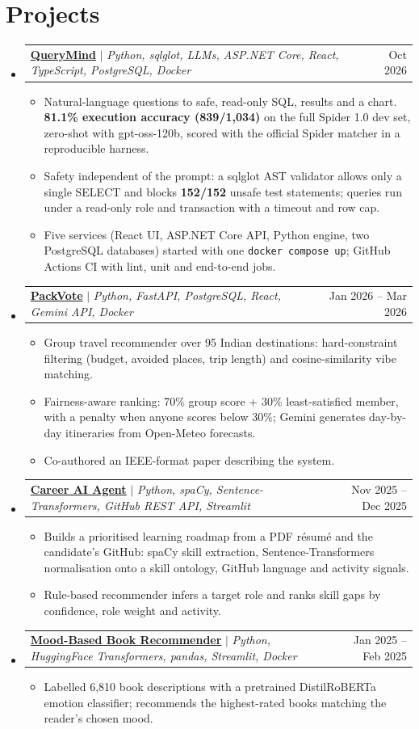 \documentclass[letterpaper,10.5pt]{article}
\makeatletter
\newcommand{\resumeItem}[1]{\item\small{#1 \vspace{-2pt}}}
\newcommand{\resumeProjectHeading}[2]{
    \item
    \begin{tabular*}{0.98\textwidth}{l@{\extracolsep{\fill}}r}
      \small#1 & \small #2 \\
    \end{tabular*}\vspace{-7pt}
}
\newcommand{\resumeSubHeadingListStart}{\begin{itemize}[leftmargin=0.15in, label={}]}
\newcommand{\resumeSubHeadingListEnd}{\end{itemize}}
\newcommand{\resumeItemListStart}{\begin{itemize}[leftmargin=0.18in]}
\newcommand{\resumeItemListEnd}{\end{itemize}\vspace{-5pt}}
\makeatother
\begin{document}
\section{Projects}
    \resumeSubHeadingListStart
      \resumeProjectHeading
          {\textbf{\href{https://github.com/sha728/querymind}{QueryMind}} $|$ \emph{Python, sqlglot, LLMs, ASP.NET Core, React, TypeScript, PostgreSQL, Docker}}{Oct 2026}
          \resumeItemListStart
            \resumeItem{Natural-language questions to safe, read-only SQL, results and a chart. \textbf{81.1\% execution accuracy (839/1,034)} on the full Spider 1.0 dev set, zero-shot with gpt-oss-120b, scored with the official Spider matcher in a reproducible harness.}
            \resumeItem{Safety independent of the prompt: a sqlglot AST validator allows only a single SELECT and blocks \textbf{152/152} unsafe test statements; queries run under a read-only role and transaction with a timeout and row cap.}
            \resumeItem{Five services (React UI, ASP.NET Core API, Python engine, two PostgreSQL databases) started with one \texttt{docker compose up}; GitHub Actions CI with lint, unit and end-to-end jobs.}
          \resumeItemListEnd
      \resumeProjectHeading
          {\textbf{\href{https://github.com/sha728/PackVoted}{PackVote}} $|$ \emph{Python, FastAPI, PostgreSQL, React, Gemini API, Docker}}{Jan 2026 -- Mar 2026}
          \resumeItemListStart
            \resumeItem{Group travel recommender over 95 Indian destinations: hard-constraint filtering (budget, avoided places, trip length) and cosine-similarity vibe matching.}
            \resumeItem{Fairness-aware ranking: 70\% group score + 30\% least-satisfied member, with a penalty when anyone scores below 30\%; Gemini generates day-by-day itineraries from Open-Meteo forecasts.}
            \resumeItem{Co-authored an IEEE-format paper describing the system.}
          \resumeItemListEnd
      \resumeProjectHeading
          {\textbf{\href{https://github.com/sha728/Career-Ai-Agent}{Career AI Agent}} $|$ \emph{Python, spaCy, Sentence-Transformers, GitHub REST API, Streamlit}}{Nov 2025 -- Dec 2025}
          \resumeItemListStart
            \resumeItem{Builds a prioritised learning roadmap from a PDF r\'esum\'e and the candidate's GitHub: spaCy skill extraction, Sentence-Transformers normalisation onto a skill ontology, GitHub language and activity signals.}
            \resumeItem{Rule-based recommender infers a target role and ranks skill gaps by confidence, role weight and activity.}
          \resumeItemListEnd
      \resumeProjectHeading
          {\textbf{\href{https://github.com/sha728/Book-Recommendation-System}{Mood-Based Book Recommender}} $|$ \emph{Python, HuggingFace Transformers, pandas, Streamlit, Docker}}{Jan 2025 -- Feb 2025}
          \resumeItemListStart
            \resumeItem{Labelled 6,810 book descriptions with a pretrained DistilRoBERTa emotion classifier; recommends the highest-rated books matching the reader's chosen mood.}
          \resumeItemListEnd
    \resumeSubHeadingListEnd
\end{document}
